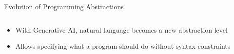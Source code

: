 \documentclass[xcolor={dvipsnames,table}, aspectratio=169]{beamer}
\begin{document}
\begin{frame}{Evolution of Programming Abstractions}
\begin{columns}
\begin{column}{0.4\textwidth}
    \end{column}
  \end{columns}
  
  \vspace{3em}

  \begin{alertbox}
    \begin{itemize}
      \item With Generative AI, natural language becomes a new abstraction level
      \item Allows specifying what a program should do without syntax constraints
    \end{itemize}
  \end{alertbox}
\end{frame}
\end{document}
